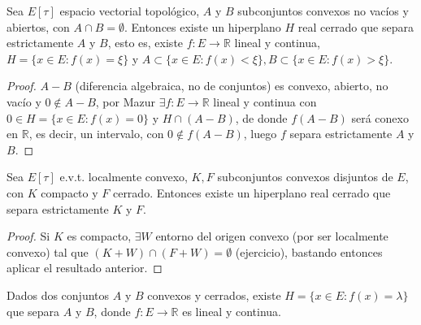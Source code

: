 \begin{corollary}
  Sea $E[\tau]$ espacio vectorial topológico, $A$ y $B$ subconjuntos convexos no
  vacíos y abiertos, con $A\cap B= \emptyset$. Entonces existe un hiperplano $H$ 
  real cerrado que separa estrictamente $A$ y $B$, esto es, existe $f:E\to
  \mathbb{R}$ lineal y continua, $H=\{x\in E:f(x)=\xi\} $ y $A\subset \{x\in
  E:f(x)<\xi\}, B\subset \{x\in E:f(x)>\xi\} $.
\end{corollary}

\begin{proof}
  $A-B$ (diferencia algebraica, no de conjuntos) es convexo, abierto, no vacío y
  $0\not\in A-B$, por Mazur $\exists f:E\to \mathbb{R}$ lineal y continua con
  $0\in H=\{x\in E:f(x)=0\} $ y $H\cap (A-B)$, de donde $f(A-B)$ será conexo en
  $\mathbb{R}$, es decir, un intervalo, con $0\not\in f(A-B)$, luego $f$ separa
  estrictamente $A$ y $B$.
\end{proof}

\begin{corollary}
  Sea $E[\tau]$ e.v.t. localmente convexo, $K,F$ subconjuntos convexos disjuntos
  de $E$, con $K$ compacto y $F$ cerrado. Entonces existe un hiperplano real
  cerrado que separa estrictamente $K$ y $F$.
\end{corollary}

\begin{proof}
  Si $K$ es compacto, $\exists W$ entorno del origen convexo (por ser localmente
  convexo) tal que $(K+W)\cap (F+W)=\emptyset$ (ejercicio), bastando entonces
  aplicar el resultado anterior.
\end{proof}


\begin{theorem}
  \label{th:h-b-geom}
  Dados dos conjuntos $A$ y $B$ convexos y cerrados, existe $H=\{x\in
  E:f(x)=\lambda\} $ que separa $A$ y $B$, donde $f:E\to \mathbb{R}$ es lineal y
  continua.
\end{theorem}
